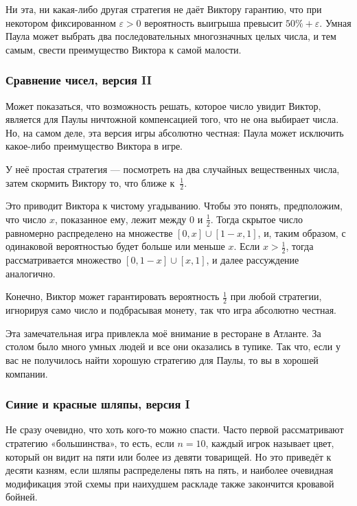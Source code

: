 Ни эта, ни какая-либо другая стратегия не даёт Виктору гарантию, что при некотором фиксированном $\varepsilon>0$ вероятность выигрыша превысит $50\%+\varepsilon$.
Умная Паула может выбрать два последовательных многозначных целых числа, и тем самым, свести преимущество Виктора к самой малости.

\subsubsection*{Сравнение чисел, версия II}%

Может показаться, что возможность решать, которое число увидит Виктор, является для Паулы ничтожной компенсацией того, что не она выбирает числа.
Но, на самом деле, эта версия игры абсолютно честная:
Паула может исключить какое-либо преимущество Виктора в игре.

У неё простая стратегия --- посмотреть на два случайных вещественных числа, затем скормить Виктору то, что ближе к~$\tfrac12$.

Это приводит Виктора к чистому угадыванию.
Чтобы это понять, предположим, что число $x$, показанное ему, лежит между $0$ и $\tfrac12$.
Тогда скрытое число равномерно распределено на множестве $[0,x]\cup [1-x, 1]$, и, таким образом, с одинаковой вероятностью будет больше или меньше $x$.
Если $x>\tfrac12$, тогда рассматривается множество $[0, 1-x]\cup [x, 1]$, и далее рассуждение аналогично.

Конечно, Виктор может гарантировать вероятность $\tfrac12$ при любой стратегии, игнорируя само число и подбрасывая монету, так что игра абсолютно честная.
\heart

Эта замечательная игра привлекла моё внимание в ресторане в Атланте.
За столом было много умных людей и все они оказались в тупике.
Так что, если у вас не получилось найти хорошую стратегию для Паулы, то вы в хорошей компании.

\subsubsection*{Синие и красные шляпы, версия I}%

Не сразу очевидно, что хоть кого-то можно спасти.
Часто первой рассматривают стратегию «большинства», то есть, если $n=10$, каждый игрок называет цвет, который он видит на пяти или более из девяти товарищей.
Но это приведёт к десяти казням, если шляпы распределены пять на пять, и наиболее очевидная модификация этой схемы при наихудшем раскладе также закончится кровавой бойней.

